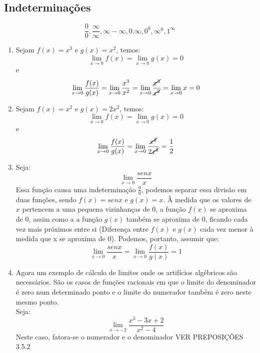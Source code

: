 \documentclass{article}
\begin{document}
		\subsection{Indeterminações}
			\begin{equation*}
				\frac{0}{0}, \frac{\infty}{\infty}, \infty - \infty, 0.\infty, 0^0, \infty^0,1^\infty	
			\end{equation*}
			\begin{enumerate}
				\item Sejam $f(x) = x^3$ e $g(x) = x^2$, temos:\\
				\[ \lim_{x\to 0}f(x) = \lim_{x\to 0}g(x) = 0 \]
				e
				\[ \lim_{x\to 0}\frac{f(x)}{g(x)} = \lim_{x\to 0}\frac{x^3}{x^2} = \lim_{x\to 0}
				\frac{\cancel{x^{3}}}{\cancel{x^2}} = \lim_{x\to 0}x = 0\]
				
				\item Sejam $f(x) = x^2$ e $g(x) = 2x^2$, temos:\\
				\[ \lim_{x\to 0}f(x) = \lim_{x\to 0}g(x) = 0\]
				e
				\[ \lim_{x\to 0}\frac{f(x)}{g(x)} = \lim_{x\to 0}\frac{\cancel{x^2}}{2\cancel{x^2}} = \frac{1}{2} \]
				
				\item Seja:
				\[ \lim_{x\to 0}\frac{senx}{x}\]
				Essa função causa uma indeterminação $\frac{0}{0}$, podemos separar essa divisão em duas funções, sendo $f(x) = senx$ e $g(x) = x$. À medida que os valores de $x$ pertencem a uma pequena vizinhanças de 0, a função $f(x)$ se aproxima de 0, assim como a a função $g(x)$ também se aproxima de 0, ficando cada vez mais próximos entre si (Diferença entre $f(x)$ e $g(x)$ cada vez menor à medida que x se aproxima de 0). Podemos, portanto, assumir que:
				\[ \lim_{x\to 0} \frac{senx}{x} = \lim_{x\to 0} \frac{f(x)}{g(x)} = 1 \]
				
				\item Agora um exemplo de  cálculo de limites onde os artifícios algébricos são necessários. São os casos de funções racionais em que o limite do denominador é zero num determinado ponto e o limite do numerador também é zero neste mesmo ponto.\\
				
				Seja:\\
				\[ \lim_{x\to -2}\frac{x^3-3x+2}{x^2-4} \]
				Neste caso, fatora-se o numerador e o denominador VER PREPOSIÇÕES 3.5.2
			\end{enumerate}
			
\end{document}
